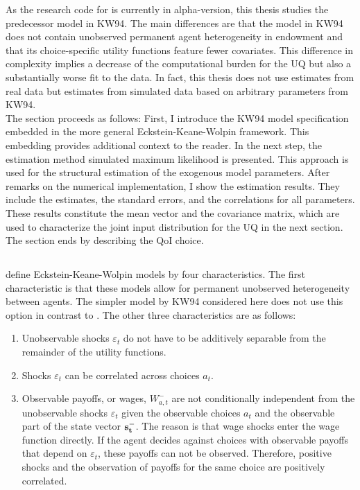 \documentclass[a4paper,12pt]{article}
\begin{document}
As the research code for \cite{Keane.1997} is currently in alpha-version, this thesis studies the predecessor model in KW94. The main differences are that the model in KW94 does not contain unobserved permanent agent heterogeneity in endowment and that its choice-specific utility functions feature fewer covariates. This difference in complexity implies a decrease of the computational burden for the UQ but also a substantially worse fit to the data. In fact, this thesis does not use estimates from real data but estimates from simulated data based on arbitrary parameters from KW94.\\
\newline
The section proceeds as follows: First, I introduce the  KW94 model specification embedded in the more general Eckstein-Keane-Wolpin framework. This embedding provides additional context to the reader. In the next step, the estimation method simulated maximum likelihood is presented. This approach is used for the structural estimation of the exogenous model parameters. After remarks on the numerical implementation, I show the estimation results. They include the estimates, the standard errors, and the correlations for all parameters. These results constitute the mean vector and the covariance matrix, which are used to characterize the joint input distribution for the UQ in the next section. The section ends by describing the QoI choice.

\subsection{\cite{Keane.1994}}

\cite{Aguirregabiria.2010} define Eckstein-Keane-Wolpin models by four characteristics. The first characteristic is that these models allow for permanent unobserved heterogeneity between agents. The simpler model by KW94 considered here does not use this option in contrast to \cite{Keane.1997}. The other three characteristics are as follows:
\begin{enumerate}
	\item Unobservable shocks $\varepsilon_t$ do not have to be additively separable from the remainder of the utility functions.
	\item Shocks $\varepsilon_t$ can be correlated across choices $a_t$.
	\item Observable payoffs, or wages, $W_{a,t}^{-}$ are not conditionally independent from the unobservable shocks $\varepsilon_t$ given the observable choices $a_t$ and the observable part of the state vector $\bold{s_t^-}$. The reason is that wage shocks enter the wage function directly. If the agent decides against choices with observable payoffs that depend on $\varepsilon_t$, these payoffs can not be observed. Therefore, positive shocks and the observation of payoffs for the same choice are positively correlated.
\end{enumerate}
\end{document}
